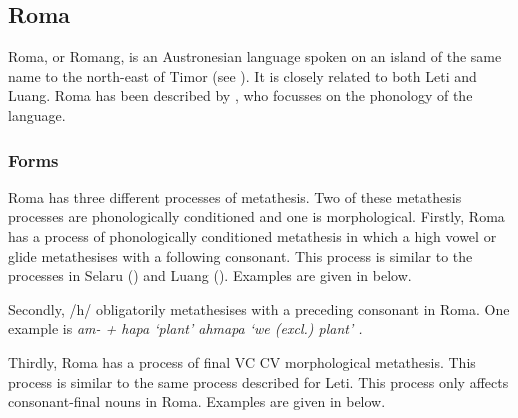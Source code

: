 \subsection{Roma}\label{sec:Rom}
Roma, or Romang, is an Austronesian language spoken on an
island of the same name to the
north-east of Timor (see ).
It is closely related to both Leti and Luang.
Roma has been described by \cite{st91},
who focusses on the phonology of the language.

\subsubsection{Forms}
Roma has three different processes of metathesis.
Two of these metathesis processes are phonologically conditioned and one is morphological.
Firstly, Roma has a process of phonologically conditioned metathesis
in which a high vowel or glide metathesises with a following consonant.
This process is similar to the processes in Selaru () and Luang ().
Examples are given in  below.

\begin{exe}
	\label{ex:RomPhoMet}
\end{exe}

Secondly, /h/ obligatorily metathesises with a preceding consonant in Roma.
One example is \it{am-}  + \it{hapa} `plant'
{\ra} \it{ahmapa} `we (excl.) plant' \citep[69]{st91}.

Thirdly, Roma has a process of final VC {\ra} CV morphological metathesis.
This process is similar to the same process described for Leti.
This process only affects consonant-final nouns in Roma.
Examples are given in  below.

